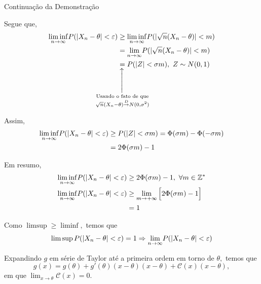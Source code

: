 \documentclass[12pt]{beamer}
\begin{document}
\begin{frame}{Continuação da Demonstração}
\vspace{-0.2cm}
\begin{block}{}
\justifying
Segue que, 
\begin{align*}
    \LimInf P(|X_{n}-\theta|<\varepsilon)&\geq \LimInf P(|\sqrt{n}(X_{n}-\theta)|<m)\\
    &=\Lim P(|\sqrt{n}(X_{n}-\theta)|<m)\\
    &\SetaUP{\text{Usando o fato de que}\\ \sqrt{n}(X_{n}-\theta)\ConvD N(0,\sigma^{2})}{=}P(|Z|<\sigma m),~Z\sim N(0,1)
\end{align*}
\end{block}
\pause
\vspace{-0.2cm}
\begin{block}{}
\justifying
Assim,
\begin{align*}
    {\displaystyle \liminf_{n\to\infty}} P(|X_{n}-\theta|<\varepsilon)&\geq P(|Z|<\sigma m)=\Phi(\sigma m)-\Phi(-\sigma m)\\
    &=2\Phi(\sigma m)-1
\end{align*}
\end{block}
\end{frame}

\begin{frame}{}
\begin{block}{}
\justifying
Em resumo,
\begin{align*}
    {\displaystyle \liminf_{n\to\infty}} P(|X_{n}-\theta|<\varepsilon)&\geq 2\Phi(\sigma m)-1,~\forall m\in \mathbb{Z}^{*}\\  
    {\displaystyle \liminf_{n\to\infty}} P(|X_{n}-\theta|<\varepsilon)&\geq \lim_{m\rightarrow +\infty} \Big[2\Phi(\sigma m)-1\Big]\\
    &=1
\end{align*}
\end{block}
\pause
\begin{block}{}
\justifying
Como $\limsup\geq \liminf,$ temos que
\begin{align}\label{num1}
    \limsup P(|X_{n}-\theta|<\varepsilon)=1\Rightarrow {\displaystyle \lim_{n\to\infty}} P(|X_{n}-\theta|<\varepsilon)
\end{align}
\end{block}
\pause
\begin{block}{}
\justifying
Expandindo $g$ em série de Taylor até a primeira ordem em torno de $\theta,$ temos que $$g(x)=g(\theta)+g'(\theta)(x-\theta)(x-\theta)+\mathcal{C}(x)(x-\theta),$$ em que ${\displaystyle \lim_{x\rightarrow \theta} \mathcal{C}(x)=0}.$
\end{block}
\end{frame}
\end{document}
